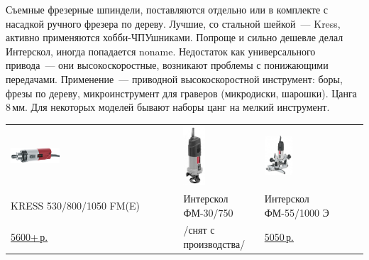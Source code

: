 Съемные фрезерные шпиндели, поставляются отдельно или в комплекте с насадкой
ручного фрезера по дереву. Лучшие, со стальной шейкой\ --- Kress, активно
применяются хобби-ЧПУшниками. Попроще и сильно дешевле делал Интерскол, иногда
попадается noname. Недостаток как универсального привода\ --- они
высокоскоростные, возникают проблемы с понижающими передачами. Применение\ ---
приводной высокоскоростной инструмент: боры, фрезы по дереву, микроинструмент
для граверов (микродиски, шарошки). Цанга 8\,мм. Для некоторых моделей бывают
наборы цанг на мелкий инструмент.

\bigskip
\begin{tabular}{p{} p{} p{} }
\noindent\includegraphics[height=0.3\textheight,width=0.3\textwidth,keepaspectratio]{tech/tools/Kress530.jpg}
&
\noindent\includegraphics[height=0.3\textheight,width=0.3\textwidth,keepaspectratio]{tech/tools/Interskol30.jpg}
&
\noindent\includegraphics[height=0.3\textheight,width=0.3\textwidth,keepaspectratio]{tech/tools/InterskolFM55.jpg}
\\
KRESS 530/800/1050 FM(E)
&
Интерскол ФМ-30/750
&
Интерскол ФМ-55/1000 Э
\\
\href{http://kress-shop.ru/product/frezernyj-dvigatel-530-fm-kress-06082302/}{5600+\,р.}
&
/снят с производства/
&
\href{http://www.kuvalda.ru/catalog/1867/27920/}{5050\,р.}
\\
\end{tabular}

\secup

